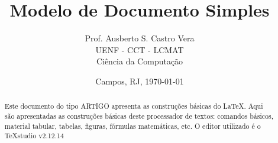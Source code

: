\documentclass[12pt]{article}
\title{\bf Modelo de Documento Simples}
\author{\textsf{Prof. Ausberto S. Castro Vera} \\
	            UENF - CCT - LCMAT \\
	            Ci\^{e}ncia da Computa\c{c}\~{a}o
	   }
\date{Campos, RJ, \today}    %
\begin{document}
\maketitle     %


\begin{abstract}
Este documento do tipo ARTIGO apresenta as constru\c{c}\~{o}es b\'{a}sicas do \LaTeX{}. Aqui s\~{a}o apresentadas as constru\c{c}\~{o}es b\'{a}sicas deste processador de textos: comandos b\'{a}sicos, material tabular, tabelas, figuras, f\'{o}rmulas matem\'{a}ticas, etc. O editor utilizado \'{e} o TeXstudio v2.12.14
\end{abstract}

\newpage
{}
\tableofcontents
\newpage





\end{document}
